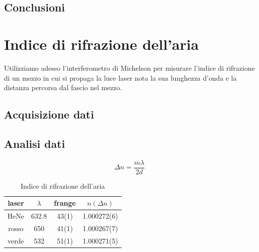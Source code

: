 \documentclass[a4paper]{article}
\begin{document}
 \begin{multicols}{2}

\subsection{Conclusioni}

\section{Indice di rifrazione dell'aria}

Utilizziamo adesso l'interferometro di Michelson per misurare l'indice di rifrazione di un mezzo in cui si propaga la luce laser nota la sua lunghezza d'onda e la distanza percorsa dal fascio nel mezzo. 

\subsection{Acquisizione dati}

\subsection{Analisi dati}
\begin{equation}
\Delta n = \frac{m\lambda}{2d}
\end{equation}



\begin{table}[H]
	\centering
	\begin{tabular}{|c|c|c|c|}
		\hline
		laser & $\lambda$ & frange  & $n(\Delta n)$ \\
		\hline
		HeNe & 632.8 & 43(1) &1.000272(6)\\
		rosso & 650 & 41(1) &1.000267(7)\\ 
		verde & 532 & 51(1) &1.000271(5)\\
		\hline
	\end{tabular}
	\caption{Indice di rifrazione dell'aria}
	\label{tab:n}
\end{table}

\end{multicols}
\end{document}
